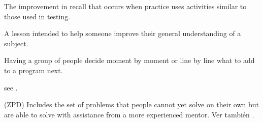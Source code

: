 \begin{description}
 The
improvement in recall that occurs when practice uses activities similar to those
used in testing.

 A lesson intended to help someone improve their
general understanding of a subject.

 Having a group of people decide moment
by moment or line by line what to add to a program next.

 see .

 (ZPD) Includes the set of problems that
people cannot yet solve on their own but are able to solve with assistance from
a more experienced mentor.  Ver también .

\end{description}
